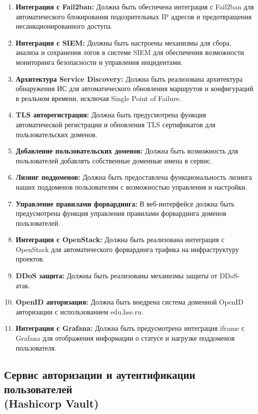 \documentclass[14pt, a4paper]{extarticle}
\begin{document}
\begin{enumerate}
\item \textbf{Интеграция с Fail2ban:} Должна быть обеспечена интеграция с Fail2ban для автоматического блокирования подозрительных IP адресов и предотвращения несанкционированного доступа.
\item \textbf{Интеграция с SIEM:} Должны быть настроены механизмы для сбора, анализа и сохранения логов в системе SIEM для обеспечения возможности мониторинга безопасности и управления инцидентами.
\item \textbf{Архитектура Service Discovery:} Должна быть реализована архитектура обнаружения ИС для автоматического обновления маршрутов и конфигураций в реальном времени, исключая Single Point of Failure.
\item \textbf{TLS авторегистрация:} Должна быть предусмотрена функция автоматической регистрации и обновления TLS сертификатов для пользовательских доменов.
\item \textbf{Добавление пользовательских доменов:} Должна быть возможность для пользователей добавлять собственные доменные имена в сервис.
\item \textbf{Лизинг поддоменов:} Должна быть предоставлена функциональность лизинга наших поддоменов пользователям с возможностью управления и настройки.
\item \textbf{Управление правилами форвардинга:} В веб-интерфейсе должна быть предусмотрена функция управления правилами форвардинга доменов пользователей.
\item \textbf{Интеграция с OpenStack:} Должна быть реализована интеграция с OpenStack для автоматического форвардинга трафика на инфраструктуру проектов.
\item \textbf{DDoS защита:} Должны быть реализованы механизмы защиты от DDoS-атак.
\item \textbf{OpenID авторизация:} Должна быть внедрена система доменной OpenID авторизации с использованием edu.hse.ru.
\item \textbf{Интеграция с Grafana:} Должна быть предусмотрена интеграция iframe с Grafana для отображения информации о статусе и нагрузке поддоменов пользователя.
\end{enumerate}


\subsection{Сервис авторизации и аутентификации пользователей\\ (Hashicorp Vault)}
\end{document}
